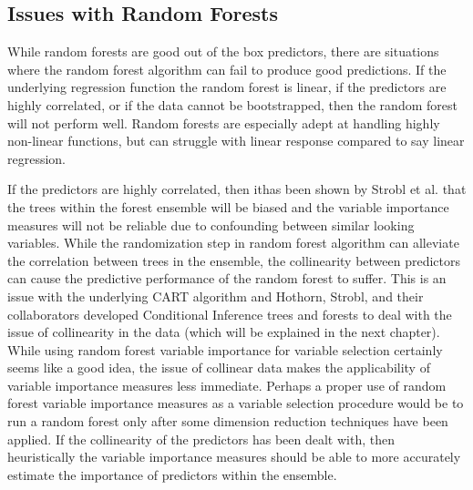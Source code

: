 \documentclass[12pt,twoside]{reedthesis}
\theoremstyle{definition}
\theoremstyle{definition}
\theoremstyle{definition}
\theoremstyle{remark}
\begin{document}
\subsection{Issues with Random
Forests}\label{issues-with-random-forests}

While random forests are good out of the box predictors, there are
situations where the random forest algorithm can fail to produce good
predictions. If the underlying regression function the random forest is
linear, if the predictors are highly correlated, or if the data cannot
be bootstrapped, then the random forest will not perform well. Random
forests are especially adept at handling highly non-linear functions,
but can struggle with linear response compared to say linear regression.

If the predictors are highly correlated, then ithas been shown by Strobl
et al. that the trees within the forest ensemble will be biased and the
variable importance measures will not be reliable due to confounding
between similar looking variables. While the randomization step in
random forest algorithm can alleviate the correlation between trees in
the ensemble, the collinearity between predictors can cause the
predictive performance of the random forest to suffer. This is an issue
with the underlying CART algorithm and Hothorn, Strobl, and their
collaborators developed Conditional Inference trees and forests to deal
with the issue of collinearity in the data (which will be explained in
the next chapter). While using random forest variable importance for
variable selection certainly seems like a good idea, the issue of
collinear data makes the applicability of variable importance measures
less immediate. Perhaps a proper use of random forest variable
importance measures as a variable selection procedure would be to run a
random forest only after some dimension reduction techniques have been
applied. If the collinearity of the predictors has been dealt with, then
heuristically the variable importance measures should be able to more
accurately estimate the importance of predictors within the ensemble.
\end{document}
